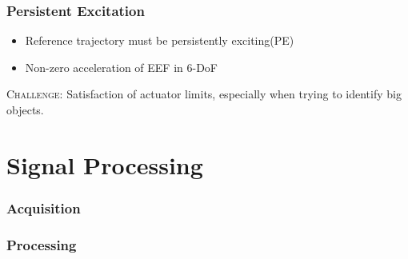 \documentclass[student,noshadow]{ITRslides}
\begin{document}
\begin{frame}
	\frametitle{Persistent Excitation}
	\vspace{1cm}	
	\begin{itemize}
		\item Reference trajectory must be persistently exciting(PE)
		\item Non-zero acceleration of EEF in 6-DoF \cite{literaturstelle3}
	\end{itemize}
	\vspace{1cm}
	\textsc{Challenge}: Satisfaction of actuator limits, especially when trying to identify big objects.
\end{frame}

\section{Signal Processing}
\begin{frame}
	\frametitle{Acquisition}
\end{frame}

\begin{frame}
	\frametitle{Processing}
\end{frame}
\end{document}

